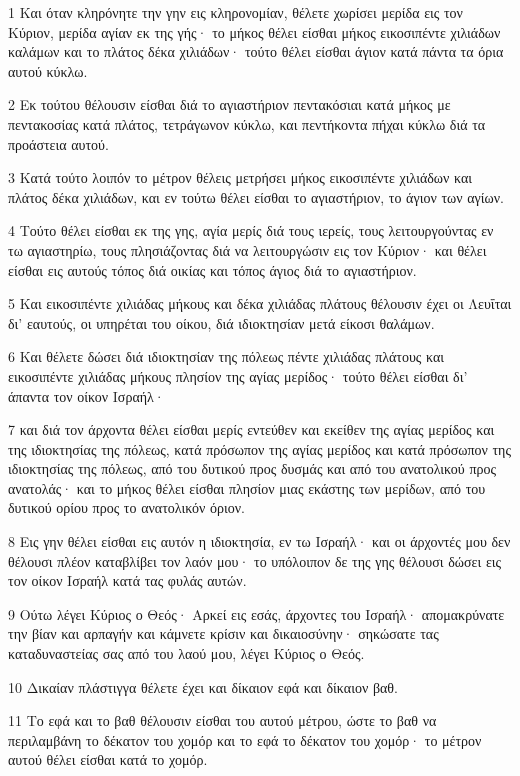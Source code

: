 \par 1 Και όταν κληρόνητε την γην εις κληρονομίαν, θέλετε χωρίσει μερίδα εις τον Κύριον, μερίδα αγίαν εκ της γής· το μήκος θέλει είσθαι μήκος εικοσιπέντε χιλιάδων καλάμων και το πλάτος δέκα χιλιάδων· τούτο θέλει είσθαι άγιον κατά πάντα τα όρια αυτού κύκλω.
\par 2 Εκ τούτου θέλουσιν είσθαι διά το αγιαστήριον πεντακόσιαι κατά μήκος με πεντακοσίας κατά πλάτος, τετράγωνον κύκλω, και πεντήκοντα πήχαι κύκλω διά τα προάστεια αυτού.
\par 3 Κατά τούτο λοιπόν το μέτρον θέλεις μετρήσει μήκος εικοσιπέντε χιλιάδων και πλάτος δέκα χιλιάδων, και εν τούτω θέλει είσθαι το αγιαστήριον, το άγιον των αγίων.
\par 4 Τούτο θέλει είσθαι εκ της γης, αγία μερίς διά τους ιερείς, τους λειτουργούντας εν τω αγιαστηρίω, τους πλησιάζοντας διά να λειτουργώσιν εις τον Κύριον· και θέλει είσθαι εις αυτούς τόπος διά οικίας και τόπος άγιος διά το αγιαστήριον.
\par 5 Και εικοσιπέντε χιλιάδας μήκους και δέκα χιλιάδας πλάτους θέλουσιν έχει οι Λευΐται δι' εαυτούς, οι υπηρέται του οίκου, διά ιδιοκτησίαν μετά είκοσι θαλάμων.
\par 6 Και θέλετε δώσει διά ιδιοκτησίαν της πόλεως πέντε χιλιάδας πλάτους και εικοσιπέντε χιλιάδας μήκους πλησίον της αγίας μερίδος· τούτο θέλει είσθαι δι' άπαντα τον οίκον Ισραήλ·
\par 7 και διά τον άρχοντα θέλει είσθαι μερίς εντεύθεν και εκείθεν της αγίας μερίδος και της ιδιοκτησίας της πόλεως, κατά πρόσωπον της αγίας μερίδος και κατά πρόσωπον της ιδιοκτησίας της πόλεως, από του δυτικού προς δυσμάς και από του ανατολικού προς ανατολάς· και το μήκος θέλει είσθαι πλησίον μιας εκάστης των μερίδων, από του δυτικού ορίου προς το ανατολικόν όριον.
\par 8 Εις γην θέλει είσθαι εις αυτόν η ιδιοκτησία, εν τω Ισραήλ· και οι άρχοντές μου δεν θέλουσι πλέον καταβλίβει τον λαόν μου· το υπόλοιπον δε της γης θέλουσι δώσει εις τον οίκον Ισραήλ κατά τας φυλάς αυτών.
\par 9 Ούτω λέγει Κύριος ο Θεός· Αρκεί εις εσάς, άρχοντες του Ισραήλ· απομακρύνατε την βίαν και αρπαγήν και κάμνετε κρίσιν και δικαιοσύνην· σηκώσατε τας καταδυναστείας σας από του λαού μου, λέγει Κύριος ο Θεός.
\par 10 Δικαίαν πλάστιγγα θέλετε έχει και δίκαιον εφά και δίκαιον βαθ.
\par 11 Το εφά και το βαθ θέλουσιν είσθαι του αυτού μέτρου, ώστε το βαθ να περιλαμβάνη το δέκατον του χομόρ και το εφά το δέκατον του χομόρ· το μέτρον αυτού θέλει είσθαι κατά το χομόρ.
